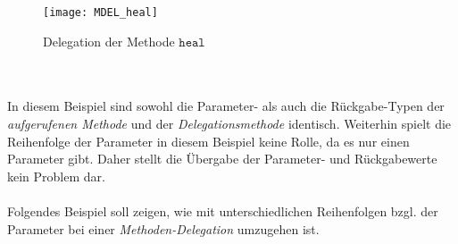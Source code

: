 \begin{figure}[h!]
\texttt{[image: MDEL\_heal]}
\caption{Delegation der Methode $\texttt{heal}$}
\label{fig:DEL_heal}
\end{figure}
\noindent
\\\\
In diesem Beispiel sind sowohl die Parameter- als auch die Rückgabe-Typen der \emph{aufgerufenen Methode} und der \emph{Delegationsmethode} identisch. Weiterhin spielt die Reihenfolge der Parameter in diesem Beispiel keine Rolle, da es nur einen Parameter gibt. Daher stellt die Übergabe der Parameter- und Rückgabewerte kein Problem dar.
\\\\
Folgendes Beispiel soll zeigen, wie mit unterschiedlichen Reihenfolgen bzgl. der Parameter bei einer \emph{Methoden-Delegation} umzugehen ist.
